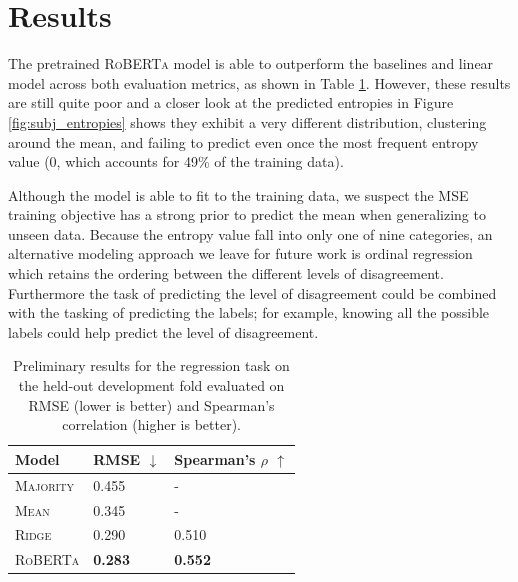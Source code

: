 \section{Results}
The pretrained \textsc{RoBERTa} model is able to outperform the baselines and linear model across both evaluation metrics, as shown in Table \ref{tab:subj_regression_results}. However, these results are still quite poor and a closer look at the predicted entropies in Figure \ref{fig:subj_entropies} shows they exhibit a very different distribution, clustering around the mean, and failing to predict even once the most frequent entropy value (0, which accounts for 49\% of the training data).

Although the model is able to fit to the training data, we suspect the MSE training objective has a strong prior to predict the mean when generalizing to unseen data. Because the entropy value fall into only one of nine categories, an alternative modeling approach we leave for future work is ordinal regression which retains the ordering between the different levels of disagreement. Furthermore the task of predicting the level of disagreement could be combined with the tasking of predicting the labels; for example, knowing all the possible labels could help predict the level of disagreement.

\begin{table}
    \centering
    \small
    \begin{tabular}{lll}
    \toprule
         Model &RMSE $\downarrow$ &Spearman's $\rho$ $\uparrow$ \\
         \midrule
         \textsc{Majority}&0.455 &-\\
         \textsc{Mean} &0.345 &-\\
         \textsc{Ridge} &0.290 &0.510 \\
         \midrule
         \textsc{RoBERTa} &\textbf{0.283} &\textbf{0.552}\\
         \bottomrule
    \end{tabular}
    \caption{Preliminary results for the regression task on the held-out development fold evaluated on RMSE (lower is better) and Spearman's correlation (higher is better).}
    \label{tab:subj_regression_results}
\end{table}


